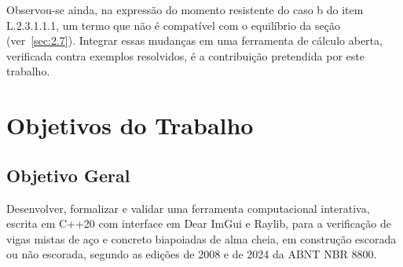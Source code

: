 Observou-se ainda, na expressão do momento resistente do caso b do item L.2.3.1.1.1, um termo que não é compatível com o equilíbrio da seção (ver~\ref{sec:2.7}). Integrar essas mudanças em uma ferramenta de cálculo aberta, verificada contra exemplos resolvidos, é a contribuição pretendida por este trabalho.

\section{Objetivos do Trabalho}\label{sec:1.3}

\subsection{Objetivo Geral}\label{sec:1.3.1}
Desenvolver, formalizar e validar uma ferramenta computacional interativa, escrita em C++20 com interface em Dear ImGui e Raylib, para a verificação de vigas mistas de aço e concreto biapoiadas de alma cheia, em construção escorada ou não escorada, segundo as edições de 2008 e de 2024 da ABNT NBR 8800.

